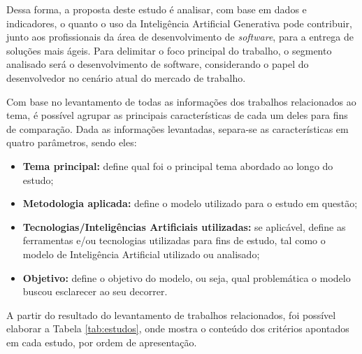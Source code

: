 \documentclass[english,brazilian]{UNISINOSartigo} %
\begin{document}
Dessa forma, a proposta deste estudo é analisar, com base em dados e indicadores, o quanto o uso da Inteligência Artificial Generativa pode contribuir, junto aos profissionais da área de desenvolvimento de \textit{software}, para a entrega de soluções mais ágeis. Para delimitar o foco principal do trabalho, o segmento analisado será o desenvolvimento de software, considerando o papel do desenvolvedor no cenário atual do mercado de trabalho.

Com base no levantamento de todas as informações dos trabalhos relacionados ao tema, é possível agrupar as principais características de cada um deles para fins de comparação. Dada as informações levantadas, separa-se as características em quatro parâmetros, sendo eles:

\begin{itemize}[leftmargin=1cm, itemsep=0.1em, topsep=0.1em]
    \item  \textbf{Tema principal:} define qual foi o principal tema abordado ao longo do estudo;
    \item \textbf{Metodologia aplicada:} define o modelo utilizado para o estudo em questão;
    \item \textbf{Tecnologias/Inteligências Artificiais utilizadas:} se aplicável, define as ferramentas e/ou tecnologias utilizadas para fins de estudo, tal como o modelo de Inteligência Artificial utilizado ou analisado;
    \item \textbf{Objetivo:} define o objetivo do modelo, ou seja, qual problemática o modelo buscou esclarecer ao seu decorrer.
\end{itemize}

A partir do resultado do levantamento de trabalhos relacionados, foi possível elaborar a Tabela \ref{tab:estudos}, onde mostra o conteúdo dos critérios apontados em cada estudo, por ordem de apresentação.
\end{document}

